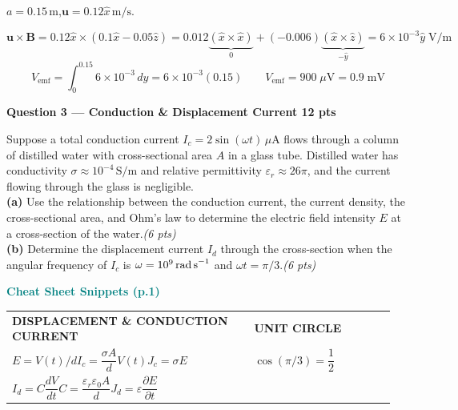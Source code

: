 \documentclass[11pt,letterpaper]{article}
\begin{document}
$a=0.15\,\text{m}$,\quad $\mathbf{u}=0.12\hat{x}\,\text{m/s}$.

\[\mathbf{u}\times\mathbf{B}=0.12\hat{x}\times(0.1\hat{x}-0.05\hat{z})
=0.012\underbrace{(\hat{x}\times\hat{x})}_{0}+(-0.006)\underbrace{(\hat{x}\times\hat{z})}_{-\hat{y}}
=6\times10^{-3}\hat{y}\;\text{V/m}\]
\[V_\text{emf}=\int_0^{0.15}6\times10^{-3}\,dy=6\times10^{-3}(0.15)
\qquad\boxed{V_\text{emf}=900\;\mu\text{V}=0.9\;\text{mV}}\]

\newpage
\colorbox{coralbg}{\parbox{\dimexpr\linewidth-2\fboxsep}{\color{coral}\large\textbf{Question 3 --- Conduction \& Displacement Current \hfill 12 pts}}}

\begin{qbox}
Suppose a total conduction current $I_c=2\sin(\omega t)\,\mu\text{A}$ flows through a column of distilled water with cross-sectional area $A$ in a glass tube. Distilled water has conductivity $\sigma\approx10^{-4}\,\text{S/m}$ and relative permittivity $\varepsilon_r\approx26\pi$, and the current flowing through the glass is negligible.\\[4pt]
\textbf{(a)} Use the relationship between the conduction current, the current density, the cross-sectional area, and Ohm's law to determine the electric field intensity $E$ at a cross-section of the water.\hfill\textit{(6 pts)}\\[3pt]
\textbf{(b)} Determine the displacement current $I_d$ through the cross-section when the angular frequency of $I_c$ is $\omega=10^9\,\text{rad\,s}^{-1}$ and $\omega t=\pi/3$.\hfill\textit{(6 pts)}
\end{qbox}

\begin{cssnip}
\textbf{\small\textcolor{teal}{Cheat Sheet Snippets (p.1)}}\\[3pt]
\begin{tabular}{@{}p{0.60\linewidth}p{0.35\linewidth}@{}}
\textbf{DISPLACEMENT \& CONDUCTION CURRENT} & \textbf{UNIT CIRCLE}\\
$E=V(t)/d$\quad $I_c=\dfrac{\sigma A}{d}V(t)$\quad $J_c=\sigma E$ & $\cos(\pi/3)=\dfrac{1}{2}$\\[4pt]
$I_d=C\dfrac{dV}{dt}$\quad $C=\dfrac{\varepsilon_r\varepsilon_0 A}{d}$\quad $J_d=\varepsilon\dfrac{\partial E}{\partial t}$ &
\end{tabular}
\end{cssnip}
\end{document}
